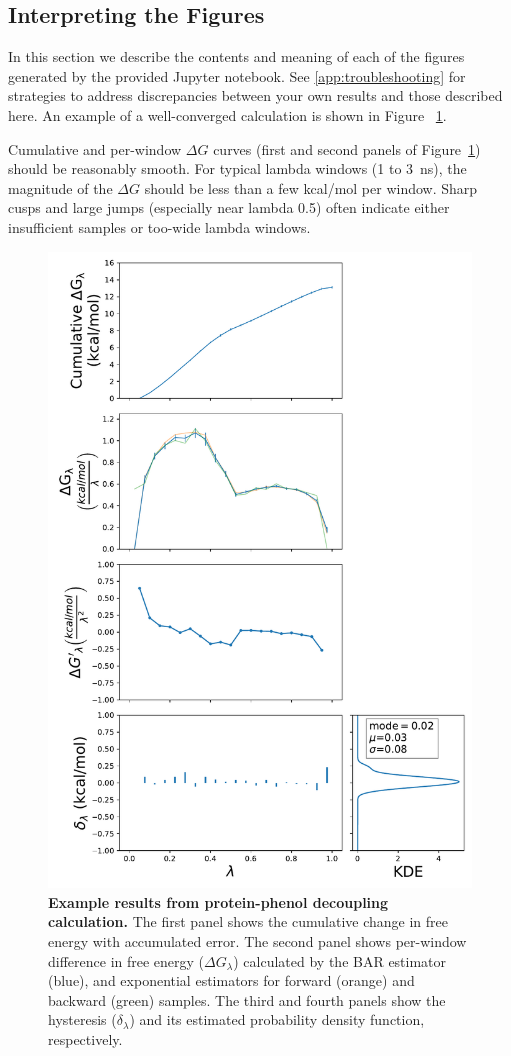 \documentclass[9pt,tutorial]{Styling/livecoms}
\begin{document}
\subsection{Interpreting the Figures}\label{app:InterpretingFEP}
In this section we describe the contents and meaning of each of the figures generated by the provided Jupyter notebook. See \ref{app:troubleshooting} for strategies to address discrepancies between your own results and those described here. An example of a well-converged calculation is shown in Figure ~\ref{fig:FEPexample}.

Cumulative and per-window $\Delta G$ curves (first and second panels of Figure~\ref{fig:FEPexample}) should be reasonably smooth. For typical lambda windows (1 to 3~ns), the magnitude of the $\Delta G$ should be less than a few kcal/mol per window. Sharp cusps and large jumps (especially near lambda 0.5) often indicate either insufficient samples or too-wide lambda windows.

\begin{figure}[!ht]
    \centering
    \includegraphics[width=0.9\linewidth]{bound_generalFigures}
    \caption{\textbf{Example results from protein-phenol decoupling calculation.} The first panel shows the cumulative change in free energy with accumulated error. The second panel shows per-window difference in free energy ($\Delta G_\lambda$) calculated by the BAR estimator (blue), and exponential estimators for forward (orange) and backward (green) samples. The third and fourth panels show the hysteresis ($\delta_\lambda$) and its estimated probability density function, respectively.
    }\label{fig:FEPexample}
\end{figure}
\end{document}
